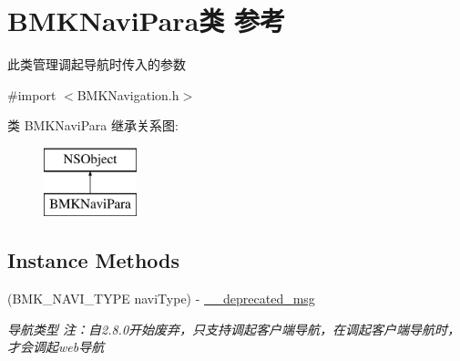 \hypertarget{interface_b_m_k_navi_para}{}\section{B\+M\+K\+Navi\+Para类 参考}
\label{interface_b_m_k_navi_para}


此类管理调起导航时传入的参数  




{\ttfamily \#import $<$B\+M\+K\+Navigation.\+h$>$}

类 B\+M\+K\+Navi\+Para 继承关系图\+:\begin{figure}[H]
\begin{center}
\leavevmode
\includegraphics[height=2.000000cm]{interface_b_m_k_navi_para}
\end{center}
\end{figure}
\subsection*{Instance Methods}
\begin{DoxyCompactItemize}
\item 
\hypertarget{interface_b_m_k_navi_para_a769d44a625e49b34874ad313a383dc56}{}(B\+M\+K\+\_\+\+N\+A\+V\+I\+\_\+\+T\+Y\+P\+E navi\+Type) -\/ \hyperlink{interface_b_m_k_navi_para_a769d44a625e49b34874ad313a383dc56}{\+\_\+\+\_\+deprecated\+\_\+msg}\label{interface_b_m_k_navi_para_a769d44a625e49b34874ad313a383dc56}

\begin{DoxyCompactList}\small\item\em 导航类型 注：自2.8.\+0开始废弃，只支持调起客户端导航，在调起客户端导航时，才会调起web导航 \end{DoxyCompactList}\end{DoxyCompactItemize}
